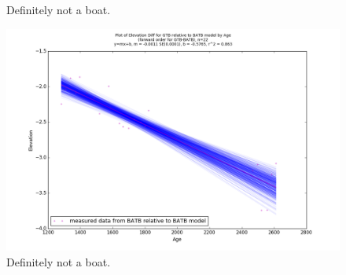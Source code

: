 \documentclass{article}
\begin{document}
\begin{figure}[h]
	\caption{Definitely not a boat.}
	\label{fig:data_GTBxBATB}
\end{figure}
\newpage

\begin{figure}[h]
	\includegraphics[width=\linewidth]{data/gias/theGIA_GTB_relative_to_BATB.png}
	\caption{Definitely not a boat.}
	\label{fig:gias_GTBxBATB}
\end{figure}
\newpage
\end{document}

